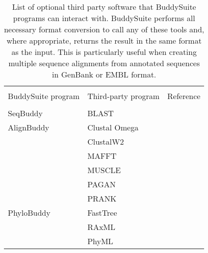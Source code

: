 \documentclass[twocolumn]{bmcart}%
\begin{document}
\begin{backmatter}
\begin{table}[h!]
\caption{List of optional third party software that BuddySuite programs can interact with. BuddySuite performs all necessary format conversion to call any of these tools and, where appropriate, returns the result in the same format as the input. This is particularly useful when creating multiple sequence alignments from annotated sequences in GenBank or EMBL format.}
      \begin{tabular}{lll}
        \hline \\
	   BuddySuite program	& Third-party program					& Reference  \\ \\
        \hline
        SeqBuddy			& BLAST 								& \cite{Camacho2009} \\
        \hline
        AlignBuddy			& Clustal Omega 						& \cite{Sievers:2011fn} \\
        					& ClustalW2 							& \cite{Larkin:2007hz} \\
							& MAFFT 								& \cite{Katoh:2013hm} \\
							& MUSCLE 								& \cite{Edgar:2004bo} \\
							& PAGAN 								& \cite{Loytynoja:2012fy} \\
        					& PRANK 								& \cite{Loytynoja:2005cb} \\				
        \hline
        PhyloBuddy			& FastTree 								& \cite{Price:2010eg} \\
        					& RAxML 								& \cite{Stamatakis:2006de} \\
        					& PhyML 								& \cite{Guindon:2010gf} \\
        \hline
      \end{tabular}
\label{table:software}
\end{table}


\end{backmatter}
\end{document}
